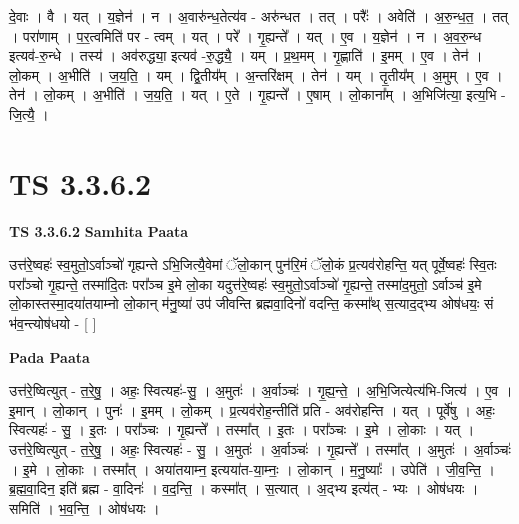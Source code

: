 \documentclass[17pt]{extarticle}
\begin{document}
दे॒वाः । वै । यत् । य॒ज्ञेन॑ । न । अ॒वारु॑न्ध॒तेत्य॑व - अरु॑न्धत । तत् । परैः᳚ । अवेति॑ । अ॒रु॒न्ध॒त॒ । तत् । परा॑णाम् । प॒र॒त्वमिति॑ पर - त्वम् । यत् । परे᳚ । गृ॒ह्यन्ते᳚ । यत् । ए॒व । य॒ज्ञेन॑ । न । अ॒व॒रु॒न्ध इत्यव॑-रु॒न्धे । तस्य॑ । अव॑रुद्ध्या॒ इत्यव॑ -रु॒द्ध्यै॒ । यम् । प्र॒थ॒मम् । गृ॒ह्णाति॑ । इ॒मम् । ए॒व । तेन॑ । लो॒कम् । अ॒भीति॑ । ज॒य॒ति॒ । यम् । द्वि॒तीय᳚म् । अ॒न्तरि॑क्षम् । तेन॑ । यम् । तृ॒तीय᳚म् । अ॒मुम् । ए॒व । तेन॑ । लो॒कम् । अ॒भीति॑ । ज॒य॒ति॒ । यत् । ए॒ते । गृ॒ह्यन्ते᳚ । ए॒षाम् । लो॒काना᳚म् । अ॒भिजि॑त्या॒ इत्य॒भि - जि॒त्यै॒ ।  \newline





\section{ TS 3.3.6.2 }

\textbf{TS 3.3.6.2 } \newline
\textbf{Samhita Paata} \newline

उत्त॑रे॒ष्वहः॑ स्व॒मुतो॒ऽर्वाञ्चो॑ गृह्यन्ते ऽभि॒जित्यै॒वेमां ॅलो॒कान् पुन॑रि॒मं ॅलो॒कं प्र॒त्यव॑रोहन्ति॒ यत् पूर्वे॒ष्वहः॑ स्वि॒तः परा᳚ञ्चो गृ॒ह्यन्ते॒ तस्मा॑दि॒तः परा᳚ञ्च इ॒मे लो॒का यदुत्त॑रे॒ष्वहः॑ स्व॒मुतो॒ऽर्वाञ्चो॑ गृ॒ह्यन्ते॒ तस्मा॑द॒मुतो॒ ऽर्वाञ्च॑ इ॒मे लो॒कास्तस्मा॒दया॑तयाम्नो लो॒कान् म॑नु॒ष्या॑ उप॑ जीवन्ति ब्रह्मवा॒दिनो॑ वदन्ति॒ कस्मा᳚थ् स॒त्याद॒द्भ्य ओष॑धयः॒ सं भ॑व॒न्त्योष॑धयो - [  ] \newline

\textbf{Pada Paata} \newline

उत्त॑रे॒ष्वित्युत् - त॒रे॒षु॒ । अहः॒ स्वित्यहः॑-सु॒ । अ॒मुतः॑ । अ॒र्वाञ्चः॑ । गृ॒ह्य॒न्ते॒ । अ॒भि॒जित्येत्य॑भि-जित्य॑ । ए॒व । इ॒मान् । लो॒कान् । पुनः॑ । इ॒मम् । लो॒कम् । प्र॒त्यव॑रोह॒न्तीति॑ प्रति - अव॑रोहन्ति । यत् । पूर्वे॑षु । अहः॒ स्वित्यहः॑ - सु॒ । इ॒तः । परा᳚ञ्चः । गृ॒ह्यन्ते᳚ । तस्मा᳚त् । इ॒तः । परा᳚ञ्चः । इ॒मे । लो॒काः । यत् । उत्त॑रे॒ष्वित्युत् - त॒रे॒षु॒ । अहः॒ स्वित्यहः॑ - सु॒ । अ॒मुतः॑ । अ॒र्वाञ्चः॑ । गृ॒ह्यन्ते᳚ । तस्मा᳚त् । अ॒मुतः॑ । अ॒र्वाञ्चः॑ । इ॒मे । लो॒काः । तस्मा᳚त् । अया॑तयाम्न॒ इत्यया॑त-या॒म्नः॒ । लो॒कान् । म॒नु॒ष्याः᳚ । उपेति॑ । जी॒व॒न्ति॒ । ब्र॒ह्म॒वा॒दिन॒ इति॑ ब्रह्म - वा॒दिनः॑ । व॒द॒न्ति॒ । कस्मा᳚त् । स॒त्यात् । अ॒द्भ्य इत्य॑त् - भ्यः । ओष॑धयः । समिति॑ । भ॒व॒न्ति॒ । ओष॑धयः ।  \newline
\end{document}
